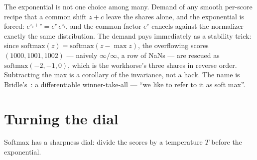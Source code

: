 \begin{narrative}
The exponential is not one choice among many. Demand of any smooth
per-score recipe that a common shift $z + c$ leave the shares alone,
and the exponential is forced: $e^{z_i + c} = e^c\, e^{z_i}$, and the
common factor $e^c$ cancels against the normalizer — exactly the same
distribution. The demand pays immediately as a stability trick:
since $\mathrm{softmax}(z) = \mathrm{softmax}(z - \max z)$, the
overflowing scores $(1000, 1001, 1002)$ — naively
$\infty/\infty$, a row of NaNs — are rescued as
$\mathrm{softmax}(-2, -1, 0)$, which is the workhorse's three shares
in reverse order. Subtracting the max is a corollary of the
invariance, not a hack. The name is
Bridle's~\cite{probability-john-s-bridle-training-stochastic-model-recognition-nips-198,probability-john-s-bridle-probabilistic-interpretation-springer-1990}:
a differentiable winner-take-all — ``we like to refer to it as soft
max''.

\section{Turning the dial}

Softmax has a sharpness dial: divide the scores by a temperature $T$
before the exponential.

\begin{center}
\end{center}


\end{narrative}
